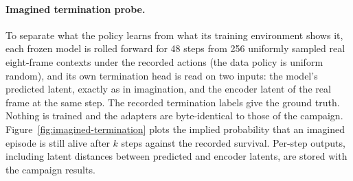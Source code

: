 \begin{table}[h]
\centering
\caption{State-blind rules on the shared evaluation packets: survival, control length and, for the
gate, walls passed, over the same 256 paired episodes as Table~\ref{tab:shared-cnn}.}
\label{tab:shared-cnn-reference}
\end{table}

\paragraph{Imagined termination probe.}
To separate what the policy learns from what its training environment shows it, each frozen model
is rolled forward for 48 steps from 256 uniformly sampled real eight-frame contexts under the
recorded actions (the data policy is uniform random), and its own termination head is read on two
inputs: the model's predicted latent, exactly as in imagination, and the encoder latent of the real
frame at the same step. The recorded termination labels give the ground truth. Nothing is trained
and the adapters are byte-identical to those of the campaign. Figure~\ref{fig:imagined-termination}
plots the implied probability that an imagined episode is still alive after $k$ steps against the
recorded survival. Per-step outputs, including latent distances between predicted and encoder
latents, are stored with the campaign results.
